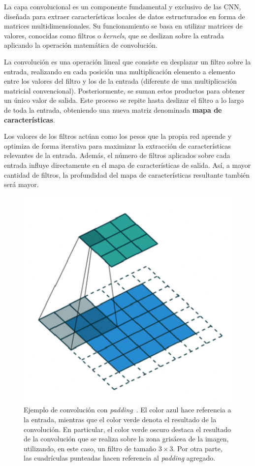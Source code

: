 La capa convolucional es un componente fundamental y exclusivo de las CNN, diseñada para extraer características locales de datos estructurados en forma de matrices multidimensionales. Su funcionamiento se basa en utilizar matrices de valores, conocidas como filtros o \emph{kernels}, que se deslizan sobre la entrada aplicando la operación matemática de convolución.

La convolución es una operación lineal que consiste en desplazar un filtro sobre la entrada, realizando en cada posición una multiplicación elemento a elemento entre los valores del filtro y los de la entrada (diferente de una multiplicación matricial convencional). Posteriormente, se suman estos productos para obtener un único valor de salida. Este proceso se repite hasta deslizar el filtro a lo largo de toda la entrada, obteniendo una nueva matriz denominada \textbf{mapa de características}.

Los valores de los filtros actúan como los pesos que la propia red aprende y optimiza de forma iterativa para maximizar la extracción de características relevantes de la entrada. Además, el número de filtros aplicados sobre cada entrada influye directamente en el mapa de características de salida. Así, a mayor cantidad de filtros, la profundidad del mapa de características resultante también será mayor.

\begin{figure}[h]
    \centering
    \includegraphics[width=0.5\linewidth]{img/convolucion.png}
    \caption[Ejemplo de convolución con \textit{padding}~\cite{Saha2018}.]{Ejemplo de convolución con \textit{padding}~\cite{Saha2018}. El color azul hace referencia a la entrada, mientras que el color verde denota el resultado de la convolución. En particular, el color verde oscuro destaca el resultado de la convolución que se realiza sobre la zona grisácea de la imagen, utilizando, en este caso, un filtro de tamaño $3 \times 3$. Por otra parte, las cuadrículas punteadas hacen referencia al \textit{padding} agregado.}\label{fig:convolucion}
\end{figure}

